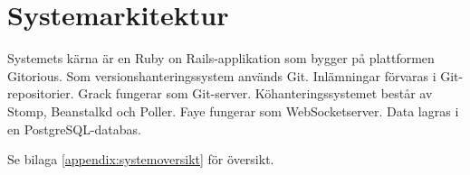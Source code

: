 \section{Systemarkitektur}
Systemets kärna är en Ruby on Rails-applikation som bygger på plattformen Gitorious. Som versionshanteringssystem används Git. Inlämningar förvaras i Git-repositorier. Grack fungerar som Git-server. Köhanteringssystemet består av Stomp, Beanstalkd och Poller. Faye fungerar som WebSocketserver. Data lagras i en PostgreSQL-databas.

Se bilaga \ref{appendix:systemoversikt} för översikt.
